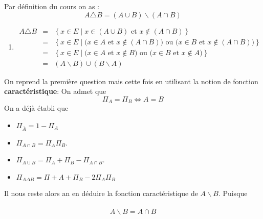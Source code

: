\documentclass{report}
\begin{document}
\begin{myproof}
  
  Par définition du cours on as :
  $$
  A \triangle B = (A\cup B) \backslash (A\cap B)
  $$
  \begin{enumerate}
    \item 
      \begin{eqnarray*}
        A \triangle B &=& \left\{  x \in E \;|\; x \in (A\cup B) \text{ et } x
          \not\in
        (A\cap B)\right\} \\
        &=&\left\{  x \in E \;|\; \big(x \in A \text{ et } x \not\in
        (A\cap B)\big)\text{ ou } 
\big(x \in B \text{ et } x \not\in
        (A\cap B)\big)
      \right\}\\
        &=&\left\{  x \in E \;|\; \big(x \in A \text{ et } x \not\in
        B\big)\text{ ou } 
\big(x \in B \text{ et } x \not\in
        A\big)
      \right\}\\
        &=& (A\backslash B) \cup (B \backslash A)
      \end{eqnarray*}
  \end{enumerate}
  
\item On reprend la première question mais cette fois en utilisant la notion de
  fonction \textbf{caractéristique}: On admet que 
  $$
  \varPi_A = \varPi_B \iff A = B
  $$
On a déjà établi que 
\begin{itemize}
  \item $\varPi_{\overline{A}} = 1 - \varPi_A$\\
  \item $\varPi_{A\cap B} = \varPi_A \varPi_B $.\\
  \item $\varPi_{A\cup B } = \varPi_A + \varPi_B - \varPi_{A\cap B}$.\\
  \item $\varPi_{A\Delta B } = \varPi+{A} + \varPi_{B} -2\varPi_{A}\varPi_{B}$
\end{itemize}
Il nous reste alors an en déduire la fonction caractéristique de $A \backslash
B$. Puisque 

\begin{eqnarray*}
  A \backslash B = A \cap \overline{B} 
\end{eqnarray*}


\end{myproof}
\end{document}
